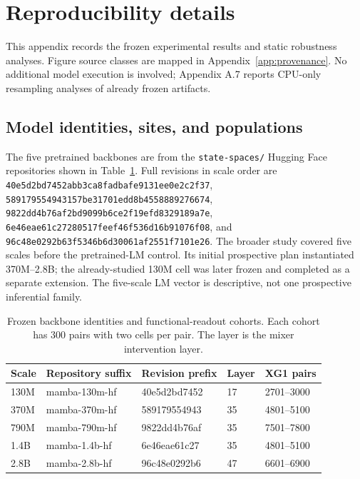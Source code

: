 \section{Reproducibility details}
\label{app:repro}

This appendix records the frozen experimental results and static robustness analyses. Figure source
classes are mapped in Appendix~\ref{app:provenance}. No additional model execution is involved; Appendix A.7 reports CPU-only resampling analyses of already frozen artifacts.

\subsection{Model identities, sites, and populations}
\label{app:identity}

The five pretrained backbones are from the \texttt{state-spaces/} Hugging
Face repositories shown in Table~\ref{tab:identity}. Full revisions in
scale order are \nolinkurl{40e5d2bd7452abb3ca8fadbafe9131ee0e2c2f37},
\nolinkurl{589179554943157be31701edd8b4558889276674},
\nolinkurl{9822dd4b76af2bd9099b6ce2f19efd8329189a7e},
\nolinkurl{6e46eae61c27280517feef46f536d16b91076f08}, and
\nolinkurl{96c48e0292b63f5346b6d30061af2551f7101e26}.
The broader study covered five scales before the pretrained-LM control.
Its initial prospective plan instantiated 370M--2.8B; the already-studied
130M cell was later frozen and completed as a separate extension. The
five-scale LM vector is descriptive, not one prospective inferential family.

\begin{table}[h]
\centering\small
\caption{Frozen backbone identities and functional-readout cohorts. Each
cohort has 300 pairs with two cells per pair. The layer is the mixer
intervention layer.}
\label{tab:identity}
\begin{tabular}{lllll}
\toprule
Scale & Repository suffix & Revision prefix & Layer & XG1 pairs \\
\midrule
130M & mamba-130m-hf & 40e5d2bd7452 & 17 & 2701--3000 \\
370M & mamba-370m-hf & 589179554943 & 35 & 4801--5100 \\
790M & mamba-790m-hf & 9822dd4b76af & 35 & 7501--7800 \\
1.4B & mamba-1.4b-hf & 6e46eae61c27 & 35 & 4801--5100 \\
2.8B & mamba-2.8b-hf & 96c48e0292b6 & 47 & 6601--6900 \\
\bottomrule
\end{tabular}
\end{table}

